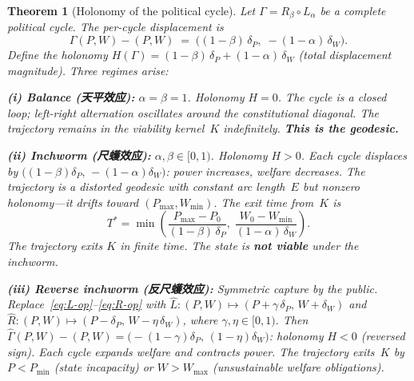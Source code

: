 \documentclass[11pt,a4paper]{article}
\newtheorem{theorem}{Theorem}[section]
\theoremstyle{definition}
\theoremstyle{remark}
\begin{document}
\begin{theorem}[Holonomy of the political cycle]\label{thm:inchworm}
Let $\Gamma = R_\beta \circ L_\alpha$ be a complete political cycle.
The per-cycle displacement is
\begin{equation}\label{eq:inchworm-displacement}
  \Gamma(P,W) - (P,W)
  \;=\; \bigl((1-\beta)\,\delta_P,\;
         -(1-\alpha)\,\delta_W\bigr).
\end{equation}
Define the \emph{holonomy} $H(\Gamma) =
(1-\beta)\,\delta_P + (1-\alpha)\,\delta_W$
(total displacement magnitude).  Three regimes arise:

\medskip
\noindent\textbf{(i) Balance (天平效应):} $\alpha = \beta = 1$.
Holonomy $H = 0$.  The cycle is a closed loop; left-right alternation
oscillates around the constitutional diagonal.
The trajectory remains in the viability kernel~$K$ indefinitely.
\textbf{This is the geodesic.}

\medskip
\noindent\textbf{(ii) Inchworm (尺蠖效应):}
$\alpha, \beta \in [0,1)$.  Holonomy $H > 0$.
Each cycle displaces by
$\bigl((1\!-\!\beta)\delta_P,\, -(1\!-\!\alpha)\delta_W\bigr)$:
power increases, welfare decreases.
The trajectory is a \emph{distorted geodesic} with constant arc
length~$E$ but nonzero holonomy---it drifts toward
$(P_{\max}, W_{\min})$.
The exit time from~$K$ is
\begin{equation}\label{eq:exit-time}
  T^* = \min\!\left(
    \frac{P_{\max} - P_0}{(1-\beta)\,\delta_P},\;
    \frac{W_0 - W_{\min}}{(1-\alpha)\,\delta_W}
  \right).
\end{equation}
The trajectory exits $K$ in finite time.
The state is \textbf{not viable} under the inchworm.

\medskip
\noindent\textbf{(iii) Reverse inchworm (反尺蠖效应):}
Symmetric capture \emph{by the public}.
Replace~\eqref{eq:L-op}--\eqref{eq:R-op} with
$\hat{L}\colon (P,W) \mapsto (P + \gamma\,\delta_P,\, W + \delta_W)$
and
$\hat{R}\colon (P,W) \mapsto (P - \delta_P,\, W - \eta\,\delta_W)$,
where $\gamma, \eta \in [0,1)$.
Then
$\hat\Gamma(P,W) - (P,W) =
\bigl(-(1\!-\!\gamma)\delta_P,\, (1\!-\!\eta)\delta_W\bigr)$:
holonomy $H < 0$ (reversed sign).
Each cycle expands welfare and contracts power.
The trajectory exits~$K$ by $P < P_{\min}$ (state incapacity) or
$W > W_{\max}$ (unsustainable welfare obligations).
\end{theorem}
\end{document}
